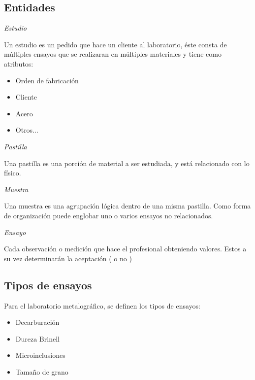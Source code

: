 \documentclass{article}
\begin{document}
\subsection{Entidades}

{\setlength{\parindent}{0cm}\emph{Estudio}}

\par Un estudio es un pedido que hace un cliente al laboratorio, éste consta de múltiples ensayos que se realizaran en múltiples materiales y tiene como atributos:

\begin{itemize}
	\item Orden de fabricación
	\item Cliente
	\item Acero
	\item Otros...
\end{itemize}

{\setlength{\parindent}{0cm}\emph{Pastilla}}

\par Una pastilla es una porción de material a ser estudiada, y está relacionado con lo físico.

{\setlength{\parindent}{0cm}\emph{Muestra}}

\par Una muestra es una agrupación lógica dentro de una misma pastilla. Como forma de organización puede englobar uno o varios ensayos no relacionados.

{\setlength{\parindent}{0cm}\emph{Ensayo}}

\par Cada observación o medición que hace el profesional obteniendo valores. Estos a su vez determinarán la aceptación ( o no )


\subsection{Tipos de ensayos}

\par Para el laboratorio metalográfico, se definen los tipos de ensayos:
\begin{itemize}
	\item Decarburación  
	\item Dureza Brinell
	\item Microinclusiones
	\item Tamaño de grano
\end{itemize}

\end{document}
